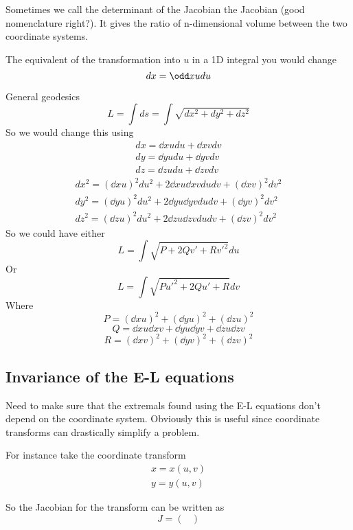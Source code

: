 \documentclass{E:/Documents/Latex/myassignment}
\begin{document}
Sometimes we call the determinant of the Jacobian the Jacobian (good nomenclature right?). It gives the ratio of n-dimensional volume between the two coordinate systems.


The equivalent of the transformation into $u$ in a 1D integral you would change
\[dx = \odd xu du\]



General geodesics
\[L = \int ds = \int \sqrt{dx^2+dy^2+dz^2}\]
So we would change this using
\begin{align*}
	dx = \dd xu du + \dd xv dv\\
	dy = \dd yu du + \dd yv dv\\
	dz = \dd zu du + \dd zv dv
\end{align*}
\begin{align*}
	dx^2 = \left(\dd xu\right)^2 du^2 + 2 \dd xu \dd xv du dv + \left(\dd xv\right)^2 dv^2\\
	dy^2 = \left(\dd yu\right)^2 du^2 + 2 \dd yu \dd yv du dv + \left(\dd yv\right)^2 dv^2\\
	dz^2 = \left(\dd zu\right)^2 du^2 + 2 \dd zu \dd zv du dv + \left(\dd zv\right)^2 dv^2
\end{align*}
So we could have either 
\[L = \int \sqrt{P + 2Q v' + Rv'^2} du\]
Or
\[L = \int \sqrt{Pu'^2 + 2Q u' + R} dv\]
Where
\[P = \left(\dd xu\right)^2 +\left(\dd yu\right)^2 +\left(\dd zu\right)^2  \]
\[Q = \dd xu \dd xv + \dd yu \dd yv + \dd zu \dd zv\]
\[R = \left(\dd xv\right)^2 +\left(\dd yv\right)^2 +\left(\dd zv\right)^2  \]




\subsection{Invariance of the E-L equations}
Need to make sure that the extremals found using the E-L equations don't depend on the coordinate system. Obviously this is useful since coordinate transforms can drastically simplify a problem.

For instance take the coordinate transform
\begin{align*}
	x = x(u,v)\\
	y = y(u,v)
\end{align*}


So the Jacobian for the transform can be written as
\[J = \begin{pmatrix}
	
\end{pmatrix}\]
\end{document}
